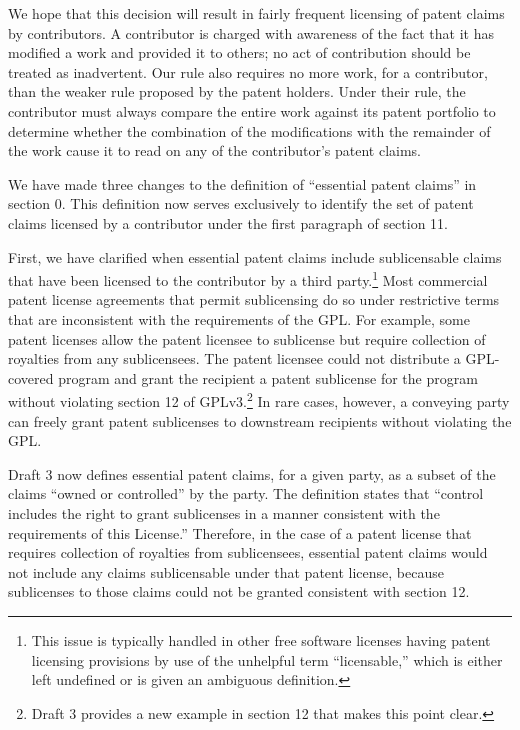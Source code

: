 We hope that this decision will result in fairly frequent licensing of
patent claims by contributors.  A contributor is charged with awareness
of the fact that it has modified a work and provided it to others; no
act of contribution should be treated as inadvertent.  Our rule also
requires no more work, for a contributor, than the weaker rule proposed
by the patent holders.  Under their rule, the contributor must always
compare the entire work against its patent portfolio to determine
whether the combination of the modifications with the remainder of the
work cause it to read on any of the contributor's patent claims.



We have made three changes to the definition of ``essential patent
claims'' in section 0.  This definition now serves exclusively to
identify the set of patent claims licensed by a contributor under the
first paragraph of section 11.

First, we have clarified when essential patent claims include
sublicensable claims that have been licensed to the contributor by a
third party.\footnote{This issue is typically handled in other free
software licenses having patent licensing provisions by use of the
unhelpful term ``licensable,'' which is either left undefined or is
given an ambiguous definition.}  Most commercial patent license
agreements that permit sublicensing do so under restrictive terms that
are inconsistent with the requirements of the GPL.  For example, some
patent licenses allow the patent licensee to sublicense but require
collection of royalties from any sublicensees.  The patent licensee
could not distribute a GPL-covered program and grant the recipient a
patent sublicense for the program without violating section 12 of
GPLv3.\footnote{Draft 3 provides a new example in section 12 that makes
this point clear.}  In rare cases, however, a conveying party can freely
grant patent sublicenses to downstream recipients without violating the
GPL.

Draft 3 now defines essential patent claims, for a given party, as a
subset of the claims ``owned or controlled'' by the party.  The
definition states that ``control includes the right to grant sublicenses
in a manner consistent with the requirements of this License.''
Therefore, in the case of a patent license that requires collection of
royalties from sublicensees, essential patent claims would not include
any claims sublicensable under that patent license, because sublicenses
to those claims could not be granted consistent with section 12.


